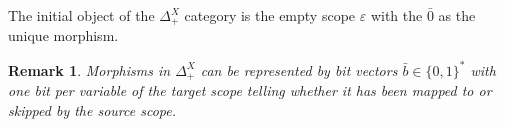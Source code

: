 \documentclass[aspectratio=169]{beamer}
\theoremstyle{remarkstyle}
\newtheorem*{remark}{Remark}
\begin{document}
\begin{frame}[fragile]
\begin{definition}
\begin{columns}
      \begin{column}{0.3\textwidth}
      \end{column}
    \end{columns}
  \end{definition}
  \begin{corollary}
    The initial object of the $Δ_+^X$ category is the empty scope $ε$ with the $\bar{0}$ as the unique morphism. 
  \end{corollary}
  \begin{remark}
    Morphisms in $Δ_+^X$ can be represented by \emph{bit vectors} $\bar{b} ∈ \{0, 1\}^*$ with one bit per variable of the target scope telling whether it has been mapped to or skipped by the source scope.
  \end{remark}
\end{frame}
\end{document}
